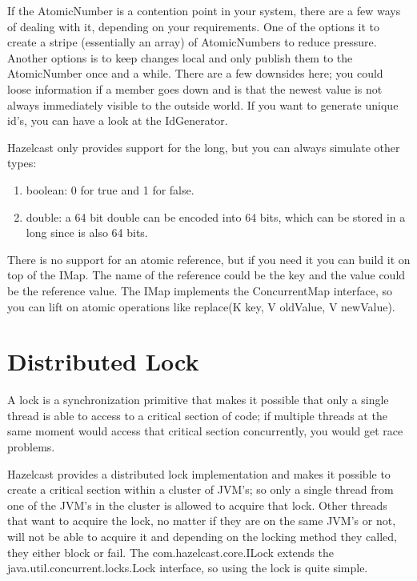 If the AtomicNumber is a contention point in your system, there are a few ways of dealing with it, depending on your requirements. One of the options it to create a stripe (essentially an array) of AtomicNumbers to reduce pressure. Another options is to keep changes local and only publish them to the AtomicNumber once and a while. There are a few downsides here; you could loose information if a member goes down and is that the newest value is not always immediately visible to the outside world. If you want to generate unique id's, you can have a look at the IdGenerator.

Hazelcast only provides support for the long, but you can always simulate other types:
\begin{enumerate}
\item boolean: 0 for true and 1 for false.
\item double: a 64 bit double can be encoded into 64 bits, which can be stored in a long since is also 64 bits.
\end{enumerate}
There is no support for an atomic reference, but if you need it you can build it on top of the IMap. The name of the reference could be the key and the value could be the reference value. The IMap implements the ConcurrentMap interface, so you can lift on atomic operations like replace(K key, V oldValue, V newValue). 

\section{Distributed Lock}
A lock is a synchronization primitive that makes it possible that only a single thread is able to access to a critical section of code; if multiple threads at the same moment would access that critical section concurrently, you would get race problems. 

Hazelcast provides a distributed lock implementation and makes it possible to create a critical section within a cluster of JVM's; so only a single thread from one of the JVM's in the cluster is allowed to acquire that lock. Other threads that want to acquire the lock, no matter if they are on the same JVM's or not, will not be able to acquire it and depending on the locking method they called, they either block or fail. The com.hazelcast.core.ILock extends the java.util.concurrent.locks.Lock interface, so using the lock is quite simple.

